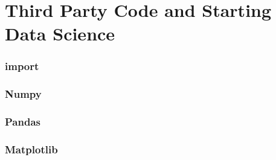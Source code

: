 \documentclass{book}
\begin{document}
\part{Third Party Code and Starting Data Science}
\section{import}
\section{Numpy}
\section{Pandas}
\section{Matplotlib}



\appendix
\printglossary[type=\acronymtype]
\end{document}
